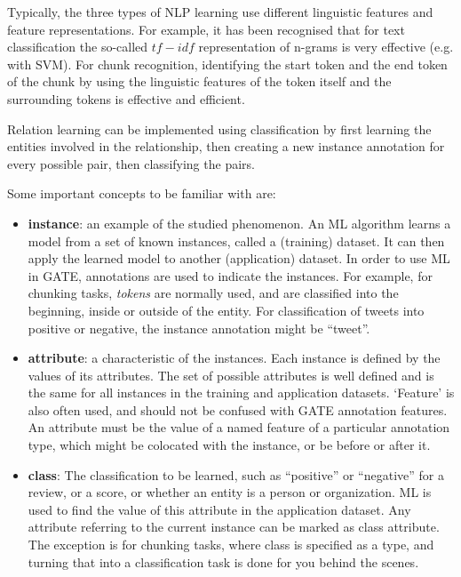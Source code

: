 Typically, the three types of NLP learning use different linguistic features and
feature representations. For example, it has been recognised that for text
classification the so-called $tf-idf$ representation of n-grams is very effective
(e.g. with SVM). For chunk recognition, identifying the start token and the end
token of the chunk by using the linguistic features of the token itself and the
surrounding tokens is effective and efficient.

Relation learning can be implemented using classification by first
learning the entities involved in the relationship, then creating a
new instance annotation for every possible pair, then classifying the
pairs.

Some important concepts to be familiar with are:

\begin{itemize}
  
\item \textbf{instance}: an example of the studied phenomenon. An ML
algorithm learns a model from a set of known instances, called a
(training) dataset. It can then apply the learned model to another
(application) dataset. In order to use ML in GATE, annotations are
used to indicate the instances. For example, for chunking
tasks, \textit{tokens} are normally used, and are classified into the
beginning, inside or outside of the entity. For classification of
tweets into positive or negative, the instance annotation might be
``tweet''.

\item \textbf{attribute}: a characteristic of the instances. Each instance is
defined by the values of its attributes. The set of possible
attributes is well defined and is the same for all instances in the
training and application datasets. `Feature' is also often used, and
should not be confused with GATE annotation features. An attribute
must be the value of a named feature of a particular annotation type,
which might be colocated with the instance, or be before or after
it.

\item \textbf{class}: The classification to be learned, such as ``positive'' or ``negative'' for a review, or a score, or whether an entity is a person or organization. ML is used to find the value of this attribute
  in the application dataset. Any attribute referring to the current
  instance can be marked as class attribute. The exception is for
  chunking tasks, where class is specified as a type, and turning that
  into a classification task is done for you behind the scenes.

\end{itemize}

